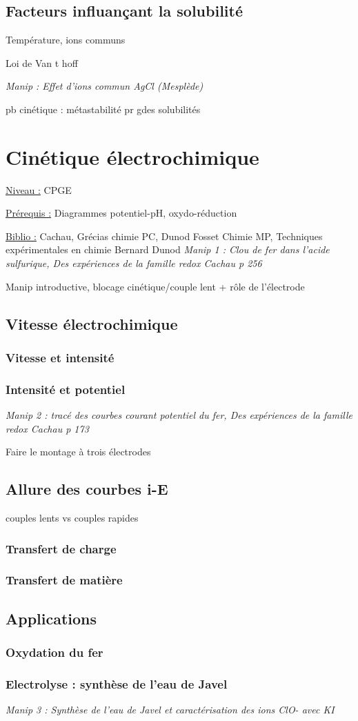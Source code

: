 \documentclass{article}%
\begin{document}
\subsection{Facteurs influançant la solubilité}
Température, ions communs

Loi de Van t hoff

\textit{Manip : Effet d’ions commun AgCl (Mesplède)}

pb cinétique : métastabilité pr gdes solubilités

\section{Cinétique électrochimique}
\underline{Niveau :} CPGE 

\underline{Prérequis :} Diagrammes potentiel-pH, oxydo-réduction

\underline{Biblio :} Cachau, Grécias chimie PC, Dunod Fosset Chimie MP, Techniques expérimentales en chimie Bernard Dunod
\textit{Manip 1 : Clou de fer dans l'acide sulfurique, Des expériences de la famille redox Cachau p 256}

Manip introductive, blocage cinétique/couple lent + rôle de l'électrode
\subsection{Vitesse électrochimique}
\subsubsection{Vitesse et intensité}
\subsubsection{Intensité et potentiel}
\textit{Manip 2 : tracé des courbes courant potentiel du fer, Des expériences de la famille redox Cachau p 173}

Faire le montage à trois électrodes
\subsection{Allure des courbes i-E}

couples lents vs couples rapides
\subsubsection{Transfert de charge}
\subsubsection{Transfert de matière}
\subsection{Applications}
\subsubsection{Oxydation du fer}
\subsubsection{Electrolyse : synthèse de l'eau de  Javel}
\textit{Manip 3 : Synthèse de l'eau de Javel et caractérisation des ions ClO- avec KI}
\end{document}
